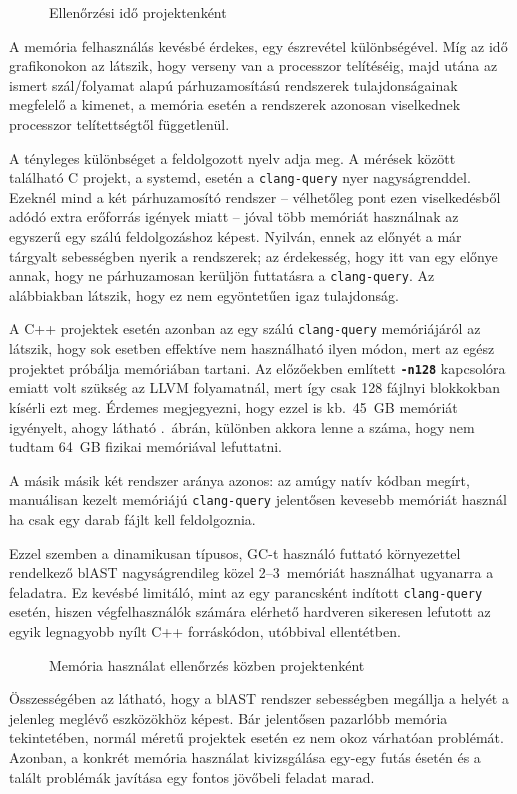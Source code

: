 \begin{figure}[htb]
	\centering
	
	\caption{Ellenőrzési idő projektenként}
	\label{fig:time}
\end{figure}

A memória felhasználás kevésbé érdekes, egy észrevétel különbségével.
Míg az idő grafikonokon az látszik, hogy verseny van a processzor telítéséig, majd utána az ismert szál/folyamat alapú párhuzamosítású rendszerek tulajdonságainak megfelelő a kimenet, a memória esetén a rendszerek azonosan viselkednek processzor telítettségtől függetlenül.

A tényleges különbséget a feldolgozott nyelv adja meg.
A mérések között található C projekt, a systemd, esetén a {\tt clang-query} nyer nagyságrenddel.
Ezeknél mind a két párhuzamosító rendszer -- vélhetőleg pont ezen viselkedésből adódó extra erőforrás igények miatt -- jóval több memóriát használnak az egyszerű egy szálú feldolgozáshoz képest.
Nyilván, ennek az előnyét a már tárgyalt sebességben nyerik a rendszerek; az érdekesség, hogy itt van egy előnye annak, hogy ne párhuzamosan kerüljön futtatásra a {\tt clang-query}.
Az alábbiakban látszik, hogy ez nem egyöntetűen igaz tulajdonság.

A C++ projektek esetén azonban az egy szálú {\tt clang-query} memóriájáról az látszik, hogy sok esetben effektíve nem használható ilyen módon, mert az egész projektet próbálja memóriában tartani.
Az előzőekben említett {\tt\bf -n128} kapcsolóra emiatt volt szükség az LLVM folyamatnál, mert így csak 128 fájlnyi blokkokban kísérli ezt meg.
Érdemes megjegyezni, hogy ezzel is kb.~45~GB memóriát igyényelt, ahogy látható .~ábrán, különben akkora lenne a száma, hogy nem tudtam 64~GB fizikai memóriával lefuttatni.

A másik másik két rendszer aránya azonos: az amúgy natív kódban megírt, manuálisan kezelt memóriájú {\tt clang-query} jelentősen kevesebb memóriát használ ha csak egy darab fájlt kell feldolgoznia.

Ezzel szemben a dinamikusan típusos, \gls{GC}-t használó futtató környezettel rendelkező blAST nagyságrendileg közel 2--3\texttimes\ memóriát használhat ugyanarra a feladatra.
Ez kevésbé limitáló, mint az egy parancsként indított {\tt clang-query} esetén, hiszen végfelhasználók számára elérhető hardveren sikeresen lefutott az egyik legnagyobb nyílt C++ forráskódon, utóbbival ellentétben.

\begin{figure}[htb]
	\centering
	
	\caption{Memória használat ellenőrzés közben projektenként}
	\label{fig:mem}
\end{figure}

Összességében az látható, hogy a blAST rendszer sebességben megállja a helyét a jelenleg meglévő eszközökhöz képest.
Bár jelentősen pazarlóbb memória tekintetében, normál méretű projektek esetén ez nem okoz várhatóan problémát.
Azonban, a konkrét memória használat kivizsgálása egy-egy futás ésetén és a talált problémák javítása egy fontos jövőbeli feladat marad.

